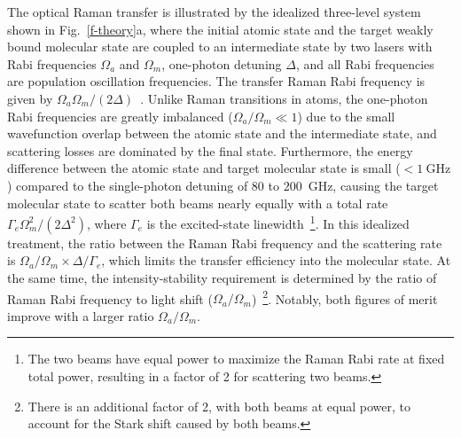 \documentclass[aps,prl,twocolumn,10pt,superscriptaddress]{revtex4-1}
\begin{document}
The optical Raman transfer is illustrated
by the idealized three-level system shown in Fig.~\ref{f-theory}a,
where the initial atomic state and the target weakly bound molecular state are coupled to an intermediate state by two lasers with Rabi frequencies $\Omega_a$ and $\Omega_m$, one-photon detuning $ \Delta $, and all Rabi frequencies are population oscillation frequencies.  %
The transfer Raman Rabi frequency is given by $\Omega_a\Omega_m / (2\Delta)$~\cite{Wineland2003}.
Unlike Raman transitions in atoms, the one-photon Rabi frequencies are greatly imbalanced ($\Omega_a/\Omega_m \ll 1$) %
due to the small wavefunction overlap between the atomic state and the intermediate state, %
and scattering losses are dominated by the final state. Furthermore, the energy difference between the atomic state and target molecular state is small ($ < 1~\mathrm{GHz} $) compared to the single-photon detuning of $80$ to $200$~GHz, causing the target molecular state to scatter both beams nearly equally with a total rate $ \Gamma_e \Omega_m^2 / (2\Delta^2)$, where $ \Gamma_e $ is the excited-state linewidth~\footnote{The two beams have equal power to maximize the Raman Rabi rate at fixed total power, resulting in a factor of 2 for scattering two beams.}.
In this idealized treatment, the ratio between the Raman Rabi frequency and the scattering rate is $ \Omega_a/\Omega_m \times \Delta/\Gamma_e $, which limits the transfer efficiency into the molecular state. At the same time, the intensity-stability requirement is determined by the ratio of Raman Rabi frequency to light shift ($\Omega_a/\Omega_m$)~\footnote{There is an additional factor of 2, with both beams at equal power,
  to account for the Stark shift caused by both beams.}. Notably, both figures of merit improve with a larger ratio $\Omega_a/\Omega_m$. %
\end{document}
